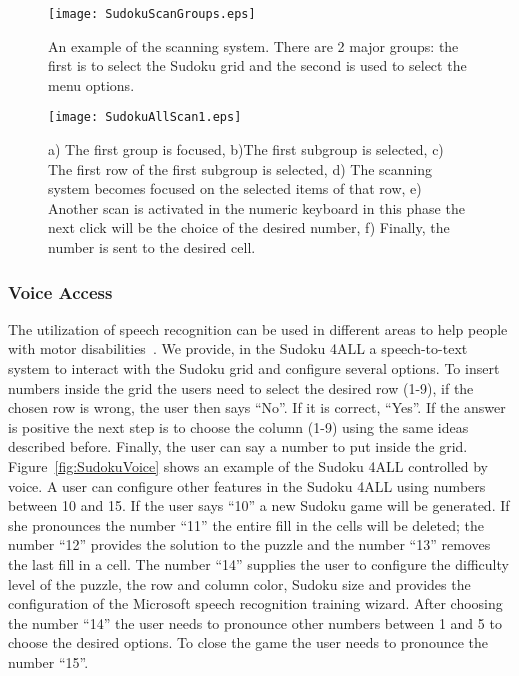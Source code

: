 \documentclass[doublespace,11pt]{article}
\begin{document}
\begin{spacing}{1}
\begin{figure}
\begin{center}
\texttt{[image: SudokuScanGroups.eps]}
\end{center}
\caption{An example of the scanning system. There are 2 major groups: the first is to select the Sudoku grid and the
second is used to select the menu options.}
\label{fig:SudokuScanGroups}
\end{figure}


\begin{figure}
\begin{center}
\texttt{[image: SudokuAllScan1.eps]}
\end{center}
\caption{a) The first group is focused, b)The first subgroup is selected, c) The first row of the first subgroup is
selected, d) The scanning system becomes focused on the selected items of that row, e) Another scan is activated 
in the numeric keyboard in this phase the next click will be the choice of the desired number, f) Finally, the number 
is sent to the desired cell.}
\label{fig:SudokuAllScan}
\end{figure}





\subsubsection{Voice Access}

The utilization of speech recognition can be used in different areas to help people with motor 
disabilities~\cite{Karimullah:02}. We provide, in the Sudoku 4ALL a speech-to-text system to interact with the Sudoku 
grid and configure several options. To insert numbers inside the grid the users need to select the 
desired row (1-9), if the chosen row is wrong, the user then says ``No''. If it is correct, ``Yes''. If the answer is 
positive the next step is to choose the column (1-9) using the same ideas described before. Finally, the 
user can say a number to put inside the grid. Figure~\ref{fig:SudokuVoice} shows an example of the Sudoku 4ALL controlled by voice.
A user can configure other features in the Sudoku 4ALL using numbers 
between 10 and 15. If the user says ``10'' a new Sudoku game will be generated. If she pronounces the number ``11'' the 
entire fill in the cells will be deleted; the number ``12'' provides the solution to the puzzle and the number ``13'' removes 
the last fill in a cell.  
The number ``14'' supplies the user to configure the difficulty level of the puzzle, the row and column color, Sudoku size and provides 
the configuration of the Microsoft speech recognition training wizard. After choosing the number ``14'' the user 
needs to pronounce other numbers between 1 and 5 to choose the desired options.
To close the game the user needs to pronounce the number ``15''.




\end{spacing}
\end{document}
